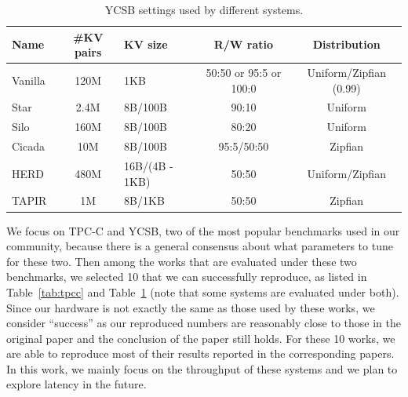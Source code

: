  \begin{table}[t]
 \centering
\begin{tabular}{lcm{3cm}cc}
        Name     & \#KV pairs & KV size & R/W ratio & Distribution  \\
    \toprule
        Vanilla~\cite{ycsburl}  & 120M & 1KB & 50:50 or 95:5 or 100:0 & Uniform/Zipfian (0.99)  \\
    \midrule
        Star~\cite{Lu2019Star, StarSRC}      &   2.4M & 8B/100B  &  90:10   &  Uniform   \\
        Silo~\cite{Tu2013Silo,siloSRC}       & 160M  & 8B/100B  &  80:20  &  Uniform \\
        Cicada~\cite{Lim2017Cicada,cicadaSRC}      & 10M  & 8B/100B  & 95:5/50:50 & Zipfian  \\
        HERD~\cite{Kalia2014HERD, HERDSRC}         & 480M  & 16B/(4B - 1KB)  &  50:50   & Uniform/Zipfian    \\
        TAPIR~\cite{Zhang15Building,tapir-repo}     & 1M & 8B/1KB & 50:50 & Zipfian  \\
    \bottomrule
\end{tabular}
\caption{YCSB settings used by different systems.}
\vspace{-.1in}
\label{tab:ycsb}
\end{table}

We focus on TPC-C and YCSB, two of the most popular benchmarks used in our
community, because there is a general consensus about what parameters to
tune for these two. Then among the works that are evaluated under these two benchmarks,
we selected 10 that we can successfully reproduce, as listed
in Table~\ref{tab:tpcc} and Table~\ref{tab:ycsb} (note that some systems are evaluated under
both). Since our hardware is not exactly the same as those used by these works, we consider ``success''
as our reproduced numbers are reasonably close to those in the original paper and the conclusion of the
paper still holds. For these 10 works, we are able to reproduce most of their results reported in the corresponding papers.
In this work, we mainly focus on the throughput of these systems and we plan to
explore latency in the future.


